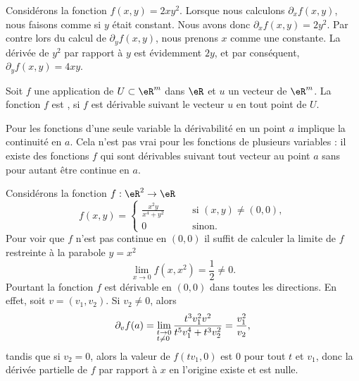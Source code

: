 \begin{example}
	Considérons la fonction $f(x,y)=2xy^2$. Lorsque nous calculons $\partial_xf(x,y)$, nous faisons comme si $y$ était constant. Nous avons donc $\partial_xf(x,y)=2y^2$. Par contre lors du calcul de $\partial_yf(x,y)$, nous prenons $x$ comme une constante. La dérivée de $y^2$ par rapport à $y$ est évidemment $2y$, et par conséquent, $\partial_yf(x,y)=4xy$.
\end{example}

\begin{definition}
  Soit $f$ une application de $U\subset\eR^m$ dans $\eR$ et $u$ un vecteur de $\eR^m$. La fonction $f$ est , si $f$ est dérivable  suivant le vecteur $u$ en tout point de $U$.
\end{definition}

Pour les fonctions d'une seule variable la dérivabilité en un point $a$ implique la continuité en $a$. Cela n'est pas vrai pour les fonctions de plusieurs variables : il existe des fonctions $f$  qui sont dérivables suivant tout vecteur au point $a$ sans pour autant être continue en $a$.

  \begin{example}
    Considérons la fonction $f:\eR^2\to \eR$
    \begin{equation}
      f(x,y)=\left\{
      \begin{array}{ll}
        \frac{x^2y}{x^4+y^2} \qquad&\textrm{si } (x,y)\neq (0,0),\\
        0     & \textrm{sinon}.
      \end{array}
      \right.
    \end{equation}
Pour voir que $f$ n'est pas continue en $(0,0)$ il suffit de calculer la limite de $f$ restreinte à la parabole $y=x^2$
\[
\lim_{x\to 0} f(x,x^2)=\frac{1}{2} \neq 0.
\]
Pourtant la fonction $f$ est dérivable en $(0,0)$ dans toutes les directions. En effet, soit $v=(v_1,v_2)$. Si $v_2\neq 0$, alors
\[
\partial_v f(a)=\lim_{\begin{subarray}{l}
			t\to 0\\ t\neq 0
  		\end{subarray}}
  		\frac{t^3v_1^2v^2}{t^5 v_1^4+ t^3v_2^2}=\frac{v_1^2}{v_2},
\]
tandis que si $v_2=0$, alors la valeur de $f(tv_1, 0)$  est $0$ pour tout $t$ et $v_1$, donc la dérivée partielle de $f$ par rapport à $x$ en l'origine existe et est nulle.
\end{example}

